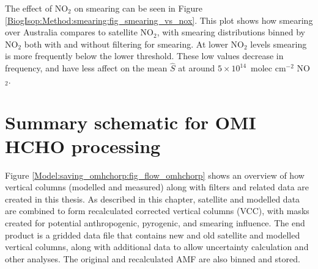       The effect of NO$_2$ on smearing can be seen in Figure \ref{BiogIsop:Method:smearing:fig_smearing_vs_nox}.
      This plot shows how smearing over Australia compares to satellite NO$_2$, with smearing distributions binned by NO$_2$ both with and without filtering for smearing.
      At lower NO$_2$ levels smearing is more frequently below the lower threshold. 
      These low values decrease in frequency, and have less affect on the mean $\hat{S}$ at around $5 \times 10^{14} $~molec cm$^{-2}$ NO$_2$.
      
    
\section{Summary schematic for OMI HCHO processing}
  \label{Model:saving_omhchorp}
  Figure \ref{Model:saving_omhchorp:fig_flow_omhchorp} shows an overview of how vertical columns (modelled and measured) along with filters and related data are created in this thesis.
  As described in this chapter, satellite and modelled data are combined to form recalculated corrected vertical columns (VCC), with masks created for potential anthropogenic, pyrogenic, and smearing influence.
  The end product is a gridded data file that contains new and old satellite and modelled vertical columns, along with additional data to allow uncertainty calculation and other analyses.
  The original and recalculated AMF are also binned and stored.
  
